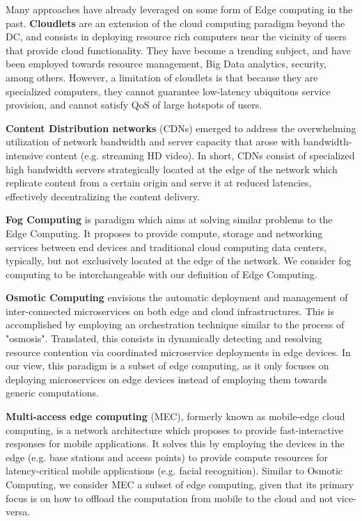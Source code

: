 Many approaches have already leveraged on some form of Edge computing in the past. \textbf{Cloudlets} \cite{10.1145/2307849.2307858} are an extension of the cloud computing paradigm beyond the DC, and consists in deploying resource rich computers near the vicinity of users that provide cloud functionality. They have become a trending subject, and have been employed towards resource management, Big Data analytics, security, among others. However, a limitation of cloudlets is that because they are specialized computers, they cannot guarantee low-latency ubiquitous service provision, and cannot satisfy QoS of large hotspots of users. 

\textbf{Content Distribution networks} \cite{peng2004cdn} (CDNs) emerged to address the overwhelming utilization of network bandwidth and server capacity that arose with bandwidth-intensive content (e.g. streaming HD video). In short, CDNs consist of specialized high bandwidth servers strategically located at the edge of the network which replicate content from a certain origin and serve it at reduced latencies, effectively decentralizing the content delivery. 

\textbf{Fog Computing} \cite{bonomi2012fog} is paradigm which aims at solving similar problems to the Edge Computing. It proposes to provide compute, storage and networking services between end devices and traditional cloud computing data centers, typically, but not exclusively located at the edge of the network. We consider fog computing to be interchangeable with our definition of Edge Computing.

\textbf{Osmotic Computing} \cite{villari2016osmotic} envisions the automatic deployment and management of inter-connected microservices on both edge and cloud infrastructures. This is accomplished by employing an orchestration technique similar to the process of "osmosis". Translated, this consists in dynamically detecting and resolving resource contention via coordinated microservice deployments in edge devices. In our view, this paradigm is a subset of edge computing, as it only focuses on deploying microservices on edge devices instead of employing them towards generic computations. 

\textbf{Multi-access edge computing} \cite{mobile_edge_cloud} (MEC), formerly known as mobile-edge cloud computing, is a network architecture which proposes to provide fast-interactive responses for mobile applications. It solves this by employing the devices in the edge (e.g. base stations and access points) to provide compute resources for latency-critical mobile applications (e.g. facial recognition). Similar to Osmotic Computing, we consider MEC a subset of edge computing, given that its primary focus is on how to offload the computation from mobile to the cloud and not vice-versa. 

